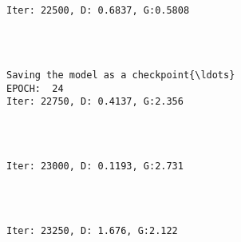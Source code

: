 \documentclass[11pt]{article}
\begin{document}
    \begin{center}
    \end{center}
    { \hspace*{\fill} \\}
    
    \begin{Verbatim}[commandchars=\\\{\}]

Iter: 22500, D: 0.6837, G:0.5808
    \end{Verbatim}

    \begin{center}
    \end{center}
    { \hspace*{\fill} \\}
    
    \begin{Verbatim}[commandchars=\\\{\}]

Saving the model as a checkpoint{\ldots}
EPOCH:  24
Iter: 22750, D: 0.4137, G:2.356
    \end{Verbatim}

    \begin{center}
    \end{center}
    { \hspace*{\fill} \\}
    
    \begin{Verbatim}[commandchars=\\\{\}]

Iter: 23000, D: 0.1193, G:2.731
    \end{Verbatim}

    \begin{center}
    \end{center}
    { \hspace*{\fill} \\}
    
    \begin{Verbatim}[commandchars=\\\{\}]

Iter: 23250, D: 1.676, G:2.122
    \end{Verbatim}
\end{document}
